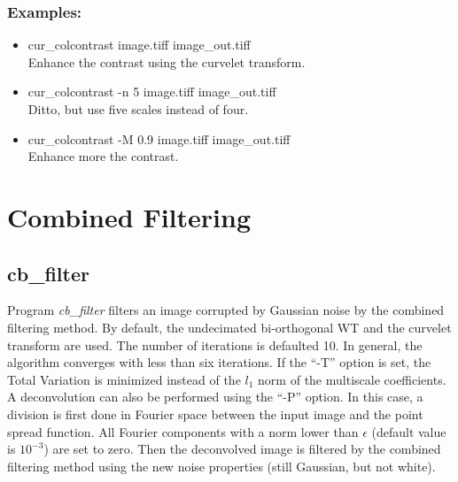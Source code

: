 \subsubsection*{Examples:}
\begin{itemize}
\baselineskip=0.4truecm
\itemsep=0.1truecm
\item cur\_colcontrast image.tiff image\_out.tiff\\
Enhance the contrast using the curvelet transform.
\item cur\_colcontrast -n 5 image.tiff image\_out.tiff\\
Ditto, but use five scales instead of four.
\item cur\_colcontrast -M 0.9 image.tiff image\_out.tiff\\
Enhance more the contrast.
\end{itemize}


\section{Combined Filtering}
\subsection{cb\_filter}
Program {\em cb\_filter} filters an image corrupted by Gaussian noise by
 the combined filtering method. By default, the undecimated  bi-orthogonal WT
 and the curvelet transform are used. The number of iterations is defaulted
 10. In general, the algorithm converges with less than six iterations.
If the ``-T'' option is set, the Total Variation is minimized instead of 
the $l_1$ norm of the multiscale coefficients.
A deconvolution can also be performed using the ``-P'' option. In this
case, a division is first done in Fourier space between the 
input image and the point spread function. All Fourier components with
a norm lower than $\epsilon$ (default value is $10^{-3}$) are set to zero.
Then the deconvolved image is filtered by the combined filtering method
using the new noise properties (still Gaussian, but not white).

